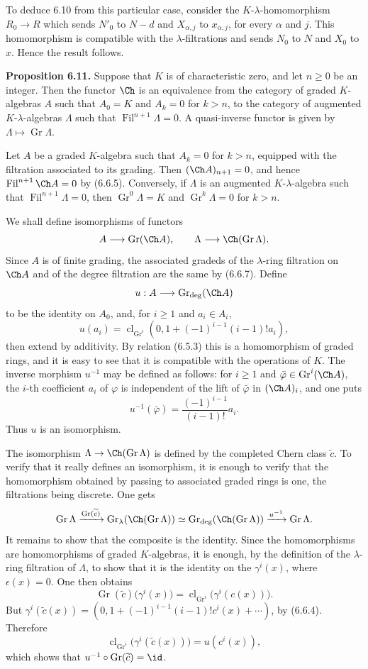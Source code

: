 \documentclass[11pt]{article}
\newcommand{\Gr}{\operatorname{Gr}}
\newcommand{\Fil}{\operatorname{Fil}}
\newcommand{\cl}{\operatorname{cl}}
\providecommand{\Gr}{\operatorname{Gr}}
\providecommand{\Gr}{\operatorname{G}}
\begin{document}
To deduce 6.10 from this particular case, consider the \(K\)-\(\lambda\)-homomorphism \(R_0\to R\) which sends \(N'_0\) to \(N-d\) and \(X_{\alpha,j}\) to \(x_{\alpha,j}\), for every \(\alpha\) and \(j\). This homomorphism is compatible with the \(\lambda\)-filtrations and sends \(N_0\) to \(N\) and \(X_0\) to \(x\). Hence the result follows.

\textbf{Proposition 6.11.} Suppose that \(K\) is of characteristic zero, and let \(n\ge0\) be an integer. Then the functor \(\Ch\) is an equivalence from the category of graded \(K\)-algebras \(A\) such that \(A_0=K\) and \(A_k=0\) for \(k>n\), to the category of augmented \(K\)-\(\lambda\)-algebras \(\Lambda\) such that \(\Fil^{n+1}\Lambda=0\). A quasi-inverse functor is given by \(\Lambda\mapsto\Gr\Lambda\).

Let \(A\) be a graded \(K\)-algebra such that \(A_k=0\) for \(k>n\), equipped with the filtration associated to its grading. Then \((\Ch A)_{n+1}=0\), and hence \(\Fil^{n+1}\Ch A=0\) by (6.6.5). Conversely, if \(\Lambda\) is an augmented \(K\)-\(\lambda\)-algebra such that \(\Fil^{n+1}\Lambda=0\), then \(\Gr^0\Lambda=K\) and \(\Gr^k\Lambda=0\) for \(k>n\).

We shall define isomorphisms of functors
\[
  A\longrightarrow \Gr(\Ch A),
  \qquad
  \Lambda\longrightarrow\Ch(\Gr\Lambda).
\]
Since \(A\) is of finite grading, the associated gradeds of the \(\lambda\)-ring filtration on \(\Ch A\) and of the degree filtration are the same by (6.6.7). Define
\[
  u:A\longrightarrow \Gr_{\deg}(\Ch A)
\]
to be the identity on \(A_0\), and, for \(i\ge1\) and \(a_i\in A_i\),
\[
  u(a_i)=
  \cl_{\Gr^i}\left(0,1+(-1)^{i-1}(i-1)!a_i\right),
\]
then extend by additivity. By relation (6.5.3) this is a homomorphism of graded rings, and it is easy to see that it is compatible with the operations of \(K\). The inverse morphism \(u^{-1}\) may be defined as follows: for \(i\ge1\) and \(\bar\varphi\in\Gr^i(\Ch A)\), the \(i\)-th coefficient \(a_i\) of \(\varphi\) is independent of the lift of \(\bar\varphi\) in \((\Ch A)_i\), and one puts
\[
  u^{-1}(\bar\varphi)=\frac{(-1)^{i-1}}{(i-1)!}a_i.
\]
Thus \(u\) is an isomorphism.

The isomorphism \(\Lambda\to\Ch(\Gr\Lambda)\) is defined by the completed Chern class \(\widetilde c\). To verify that it really defines an isomorphism, it is enough to verify that the homomorphism obtained by passing to associated graded rings is one, the filtrations being discrete. One gets
\[
  \Gr\Lambda
   \xrightarrow{\Gr(\widetilde c)}
  \Gr_{\lambda}(\Ch(\Gr\Lambda))
   \simeq
  \Gr_{\deg}(\Ch(\Gr\Lambda))
   \xrightarrow{u^{-1}}
  \Gr\Lambda .
\]
It remains to show that the composite is the identity. Since the homomorphisms are homomorphisms of graded \(K\)-algebras, it is enough, by the definition of the \(\lambda\)-ring filtration of \(\Lambda\), to show that it is the identity on the \(\gamma^i(x)\), where \(\epsilon(x)=0\). One then obtains
\[
  \Gr(\widetilde c)\bigl(\gamma^i(x)\bigr)
  =
  \cl_{\Gr^i}\bigl(\gamma^i(c(x))\bigr).
\]
But \(\gamma^i(\widetilde c(x))=(0,1+(-1)^{i-1}(i-1)!c^i(x)+\cdots)\), by (6.6.4). Therefore
\[
  \cl_{\Gr^i}\bigl(\gamma^i(\widetilde c(x))\bigr)=u(c^i(x)),
\]
which shows that \(u^{-1}\circ\Gr(\widetilde c)=\id\).
\end{document}
